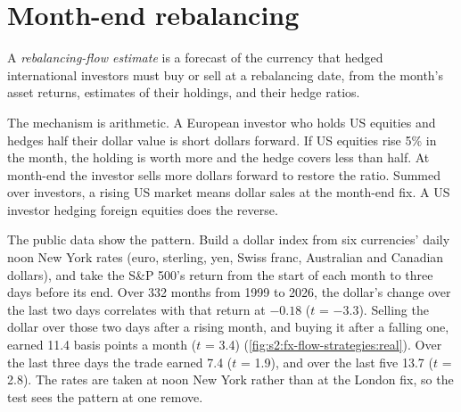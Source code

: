 \section{Month-end rebalancing}

\begin{definition}\label{def:s2:fx-flow-strategies:estimate}
A \emph{rebalancing-flow estimate} is a forecast of the currency that hedged international investors must buy or
sell at a rebalancing date, from the month's asset returns, estimates of their holdings, and their hedge ratios.
\end{definition}

The mechanism is arithmetic. A European investor who holds US equities and hedges half their dollar value is short dollars forward. If US equities
rise 5\% in the month, the holding is worth more and the hedge covers less than half. At month-end the investor sells more dollars forward to restore
the ratio. Summed over investors, a rising US market means dollar sales at the month-end fix. A US investor hedging foreign equities does the reverse.

The public data show the pattern. Build a dollar index from six currencies' daily noon New York rates (euro, sterling, yen, Swiss franc, Australian and
Canadian dollars), and take the S\&P 500's return from the start of each month to three days before its end. Over 332 months from 1999 to 2026, the
dollar's change over the last two days correlates with that return at $-0.18$ ($t$ = $-3.3$). Selling the dollar over those two days after a rising
month, and buying it after a falling one, earned 11.4 basis points a month ($t$ = 3.4)
(\cref{fig:s2:fx-flow-strategies:real}). Over the last three days the trade earned 7.4 ($t$ = 1.9), and over the last five 13.7 ($t$ = 2.8). The rates
are taken at noon New York rather than at the London fix, so the test sees the pattern at one remove.

\begin{omfigure}

\label{fig:s2:fx-flow-strategies:real}
\end{omfigure}

